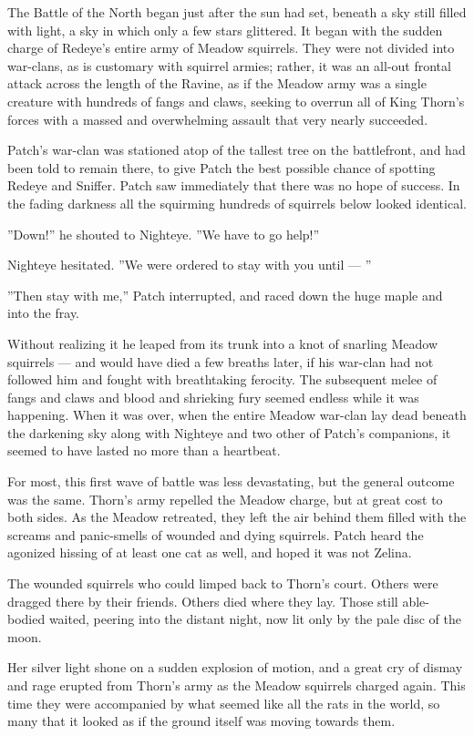 \documentclass[12pt]{book}
\begin{document}
The Battle of the North began just after the sun had set, beneath a sky still filled with light, a sky in which only a few stars glittered. It began with the sudden charge of Redeye's entire army of Meadow squirrels. They were not divided into war-clans, as is customary with squirrel armies; rather, it was an all-out frontal attack across the length of the Ravine, as if the Meadow army was a single creature with hundreds of fangs and claws, seeking to overrun all of King Thorn's forces with a massed and overwhelming assault that very nearly succeeded.

Patch's war-clan was stationed atop of the tallest tree on the battlefront, and had been told to remain there, to give Patch the best possible chance of spotting Redeye and Sniffer. Patch saw immediately that there was no hope of success. In the fading darkness all the squirming hundreds of squirrels below looked identical.

''Down!'' he shouted to Nighteye. ''We have to go help!''

Nighteye hesitated. ''We were ordered to stay with you until ---
''

''Then stay with me,'' Patch interrupted, and raced down the huge maple and into the fray.

Without realizing it he leaped from its trunk into a knot of snarling Meadow squirrels ---
and would have died a few breaths later, if his war-clan had not followed him and fought with breathtaking ferocity. The subsequent melee of fangs and claws and blood and shrieking fury seemed endless while it was happening. When it was over, when the entire Meadow war-clan lay dead beneath the darkening sky along with Nighteye and two other of Patch's companions, it seemed to have lasted no more than a heartbeat.

For most, this first wave of battle was less devastating, but the general outcome was the same. Thorn's army repelled the Meadow charge, but at great cost to both sides. As the Meadow retreated, they left the air behind them filled with the screams and panic-smells of wounded and dying squirrels. Patch heard the agonized hissing of at least one cat as well, and hoped it was not Zelina.

The wounded squirrels who could limped back to Thorn's court. Others were dragged there by their friends. Others died where they lay. Those still able-bodied waited, peering into the distant night, now lit only by the pale disc of the moon.

Her silver light shone on a sudden explosion of motion, and a great cry of dismay and rage erupted from Thorn's army as the Meadow squirrels charged again. This time they were accompanied by what seemed like all the rats in the world, so many that it looked as if the ground itself was moving towards them.
\end{document}
